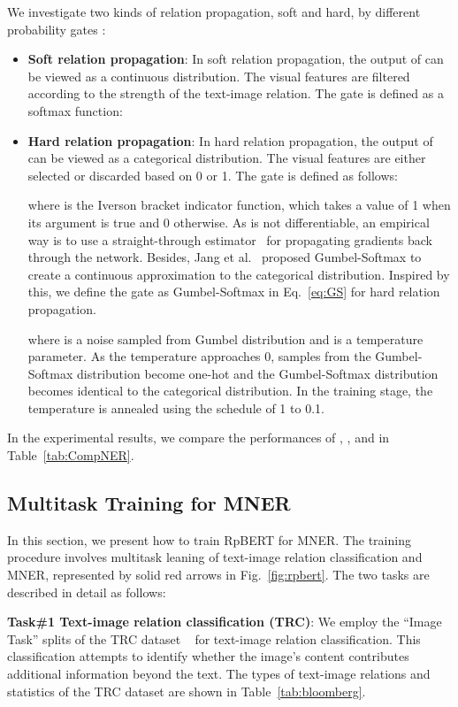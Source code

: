 \documentclass[letterpaper]{article} \usepackage{aaai21}  \usepackage{times}  \usepackage{helvet} \usepackage{courier}  \usepackage[hyphens]{url}  \usepackage{graphicx} \urlstyle{rm} \def\UrlFont{\rm}  \usepackage{natbib}  \usepackage{caption} \frenchspacing  \setlength{\pdfpagewidth}{8.5in}  \setlength{\pdfpageheight}{11in}
\begin{document}
We investigate two kinds of relation propagation, soft and hard, by different probability gates :


\begin{itemize}
\item \textbf{Soft relation propagation}: 
In soft relation propagation, the output of  can be viewed as a continuous distribution. 
The visual features are filtered according to the strength of the text-image relation.
The  gate  is defined as a softmax function:
 

\item \textbf{Hard relation propagation}:  
In hard relation propagation, the output of  can be viewed as a categorical distribution. 
The visual features are either selected or discarded based on 0 or 1.
The gate  is defined as follows:
 
where  is the Iverson bracket indicator function, which takes a value of 1 when its argument is true and 0 otherwise.
As  is not differentiable, an empirical way is to use a straight-through estimator~\cite{Bengio13estimating} for propagating  gradients back through the network.
Besides, Jang et al.~ proposed Gumbel-Softmax to create a continuous approximation to the categorical distribution. 
Inspired by this, we define the gate  as Gumbel-Softmax in Eq.~\eqref{eq:GS} for hard relation propagation.
 
where  is a noise sampled from Gumbel distribution and  is a temperature parameter. 
As the temperature approaches 0, samples from the Gumbel-Softmax distribution become one-hot and the Gumbel-Softmax distribution becomes identical to the categorical distribution. In the training stage, the temperature  is annealed using the schedule of  1 to 0.1.
\end{itemize}
In the experimental results, we compare the performances of , , and   in Table~\ref{tab:CompNER}.


\subsection{Multitask Training for MNER}
\label{sec:tasks}

In this section, we present how to train  RpBERT for MNER.
The training procedure involves multitask leaning of text-image relation classification and MNER, represented by solid red arrows in Fig.~\ref{fig:rpbert}.
The two tasks are described in detail as follows: 

\smallskip
\noindent
\textbf{Task\#1 Text-image relation classification (TRC)}:
We employ the ``Image Task'' splits of the TRC dataset ~\cite{vempala2019categorizing} for text-image relation classification. This classification attempts to identify whether the image’s content contributes additional information beyond the text.
The types of text-image relations and statistics of the TRC dataset are shown in Table~\ref{tab:bloomberg}.
\end{document}
